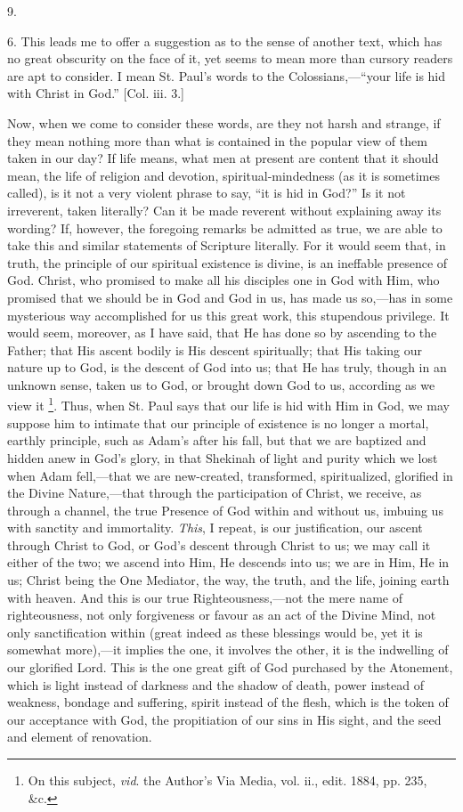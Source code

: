 9.

6. This leads me to offer a suggestion as to the sense of another
text, which has no great obscurity on the face of it, yet seems to
mean more than cursory readers are apt to consider. I mean St. Paul's
words to the Colossians,—``your life is hid with Christ in
God.'' [Col. iii. 3.]

Now, when we come to consider these words, are they not harsh and
strange, if they mean nothing more than what is contained in the
popular view of them taken in our day? If life means, what men at
present are content that it should mean, the life of religion and
devotion, spiritual-mindedness (as it is sometimes called), is it not
a very violent phrase to say, ``it is hid in God?'' Is it not
irreverent, taken literally? Can it be made reverent without
explaining away its wording? If, however, the foregoing remarks be
admitted as true, we are able to take this and similar statements of
Scripture literally. For it would seem that, in truth, the principle
of our spiritual existence is divine, is an ineffable presence of God.
Christ, who promised to make all his disciples one in God with Him,
who promised that we should be in God and God in us, has made us so,—has
in some mysterious way accomplished for us this great work, this
stupendous privilege. It would seem, moreover, as I have said, that He
has done so by ascending to the Father; that His ascent bodily is His
descent spiritually; that His taking our nature up to God, is the
descent of God into us; that He has truly, though in an unknown sense,
taken us to God, or brought down God to us, according as we view
it \footnote{On this
subject, \emph{vid}. the Author's Via Media, vol.
ii., edit. 1884, pp.
235, \&c.}. Thus, when St. Paul
says that our life is hid with Him in God, we may suppose him to
intimate that our principle of existence is no longer a mortal,
earthly principle, such as Adam's after his fall, but that we are
baptized and hidden anew in God's glory, in that Shekinah of light and
purity which we lost when Adam fell,—that we are new-created,
transformed, spiritualized, glorified in the Divine Nature,—that
through the participation of Christ, we receive, as through a channel,
the true Presence of God within and without us, imbuing us with
sanctity and immortality. \emph{This}, I repeat, is our justification,
our ascent through Christ to God, or God's descent through Christ to
us; we may call it either of the two; we ascend into Him, He descends
into us; we are in Him, He in us; Christ being the One Mediator, the
way, the truth, and the life, joining earth with heaven. And this is
our true Righteousness,—not the mere name of righteousness, not only
forgiveness or favour as an act of the Divine Mind, not only
sanctification within (great indeed as these blessings would be, yet
it is somewhat more),—it implies the one, it involves the other, it
is the indwelling of our glorified Lord. This is the one great gift of
God purchased by the Atonement, which is light instead of darkness and
the shadow of death, power instead of weakness, bondage and suffering,
spirit instead of the flesh, which is the token of our acceptance with
God, the propitiation of our sins in His sight, and the seed and
element of renovation.

